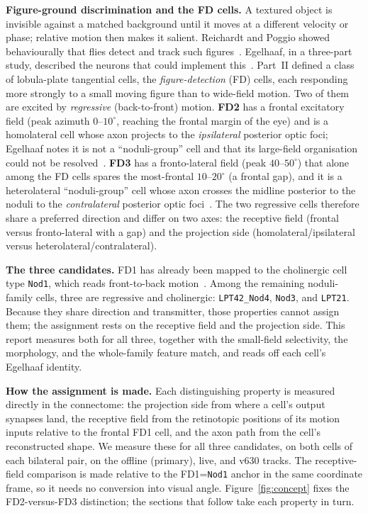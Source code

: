 \documentclass[11pt]{article}
\newcommand{\ttt}[1]{\texttt{#1}}
\begin{document}
\textbf{Figure-ground discrimination and the FD cells.}\quad
A textured object is invisible against a matched background until it moves at a different velocity or
phase; relative motion then makes it salient. Reichardt and Poggio showed behaviourally that flies
detect and track such figures~\cite{rp1979}. Egelhaaf, in a three-part study, described the neurons
that could implement this~\cite{egelhaaf1985a,egelhaaf1985b,egelhaaf1985c}. Part~II defined a class of
lobula-plate tangential cells, the \emph{figure-detection} (FD) cells, each responding more strongly
to a small moving figure than to wide-field motion. Two of them are excited by \emph{regressive}
(back-to-front) motion. \textbf{FD2} has a frontal excitatory field (peak azimuth $0$--$10^\circ$,
reaching the frontal margin of the eye) and is a homolateral cell whose axon projects to the
\emph{ipsilateral} posterior optic foci; Egelhaaf notes it is not a ``noduli-group'' cell and that its
large-field organisation could not be resolved~\cite[p.~201]{egelhaaf1985b}. \textbf{FD3} has a
fronto-lateral field (peak $40$--$50^\circ$) that alone among the FD cells spares the most-frontal
$10$--$20^\circ$ (a frontal gap), and it is a heterolateral ``noduli-group'' cell whose axon crosses
the midline posterior to the noduli to the \emph{contralateral} posterior optic
foci~\cite[p.~202--204]{egelhaaf1985b}. The two regressive cells therefore share a preferred direction
and differ on two axes: the receptive field (frontal versus fronto-lateral with a gap) and the
projection side (homolateral/ipsilateral versus heterolateral/contralateral).

\textbf{The three candidates.}\quad
FD1 has already been mapped to the cholinergic cell type \ttt{Nod1}, which reads front-to-back
motion~\cite{maisak2013,fd1989}. Among the remaining noduli-family cells, three are regressive and
cholinergic: \ttt{LPT42\_Nod4}, \ttt{Nod3}, and \ttt{LPT21}. Because they share direction and
transmitter, those properties cannot assign them; the assignment rests on the receptive field and the
projection side. This report measures both for all three, together with the small-field selectivity,
the morphology, and the whole-family feature match, and reads off each cell's Egelhaaf identity.

\textbf{How the assignment is made.}\quad
Each distinguishing property is measured directly in the connectome: the projection side from where a
cell's output synapses land, the receptive field from the retinotopic positions of its motion inputs
relative to the frontal FD1 cell, and the axon path from the cell's reconstructed shape. We measure
these for all three candidates, on both cells of each bilateral pair, on the offline (primary), live,
and v630 tracks. The receptive-field comparison is made relative to the FD1=\ttt{Nod1} anchor in the
same coordinate frame, so it needs no conversion into visual angle. Figure~\ref{fig:concept} fixes the
FD2-versus-FD3 distinction; the sections that follow take each property in turn.
\end{document}
